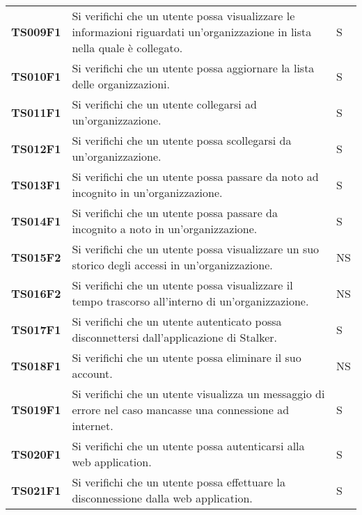 \documentclass[../../piano-di-qualifica.tex]{subfiles}
\begin{document}
\begin{longtable}[H]{>{\centering\bfseries}m{3cm} >{}m{10cm} >{\centering\arraybackslash}m{3cm}}
  TS009F1            & Si verifichi che un utente possa visualizzare le informazioni riguardati un'organizzazione in lista nella quale è collegato. 
  & S               \\


  TS010F1            & Si verifichi che un utente possa aggiornare la lista delle organizzazioni. 
  & S               \\

  TS011F1            & Si verifichi che un utente collegarsi ad un'organizzazione. 
  & S               \\

  TS012F1            & Si verifichi che un utente possa scollegarsi da un'organizzazione. 
  & S               \\

  TS013F1            & Si verifichi che un utente possa passare da noto ad incognito in un'organizzazione. 
  & S               \\

  TS014F1            & Si verifichi che un utente possa passare da incognito a noto in un'organizzazione. 
  & S               \\

  TS015F2            & Si verifichi che un utente possa visualizzare un suo storico degli accessi in un'organizzazione. 
  & NS               \\

  TS016F2            & Si verifichi che un utente possa visualizzare il tempo trascorso all'interno di un'organizzazione. 
  & NS               \\

  TS017F1            & Si verifichi che un utente autenticato possa disconnettersi dall'applicazione di Stalker. 
  & S               \\

  TS018F1            & Si verifichi che un utente possa eliminare il suo account. 
  & NS               \\

  TS019F1            & Si verifichi che un utente visualizza un messaggio di errore nel caso mancasse una connessione ad internet. 
  & S               \\

  TS020F1            & Si verifichi che un utente possa autenticarsi alla web application. 
  & S               \\

  TS021F1            & Si verifichi che un utente possa effettuare la disconnessione dalla web application. 
  & S               \\
  

\end{longtable}
\end{document}
